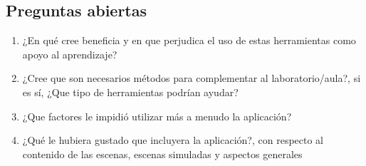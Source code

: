 \subsection{Preguntas abiertas}

\begin{enumerate}[label=\bfseries SL\arabic*.:]
    \item ¿En qué cree beneficia y en que perjudica el uso de estas herramientas
        como apoyo al aprendizaje?
    \item ¿Cree que son necesarios métodos para complementar al
        laboratorio/aula?, si es sí, ¿Que tipo de herramientas podrían ayudar?
    \item ¿Que factores le impidió utilizar más a menudo la aplicación?
    \item ¿Qué le hubiera gustado que incluyera la aplicación?, con respecto al
        contenido de las escenas, escenas simuladas y aspectos generales
\end{enumerate}
